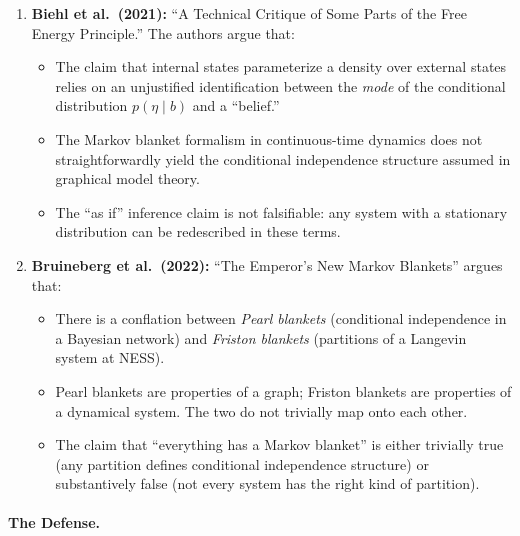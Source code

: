 \documentclass[11pt,a4paper]{article}
\theoremstyle{definition}
\begin{document}
\begin{enumerate}[leftmargin=2em]
  \item \textbf{Biehl et al.\ (2021):} ``A Technical Critique of Some Parts of
    the Free Energy Principle.''  The authors argue that:
    \begin{itemize}
      \item The claim that internal states parameterize a density over external
        states relies on an unjustified identification between the \emph{mode}
        of the conditional distribution $p(\eta \mid b)$ and a ``belief.''
      \item The Markov blanket formalism in continuous-time dynamics does not
        straightforwardly yield the conditional independence structure assumed
        in graphical model theory.
      \item The ``as if'' inference claim is not falsifiable: any system with a
        stationary distribution can be redescribed in these terms.
    \end{itemize}

  \item \textbf{Bruineberg et al.\ (2022):} ``The Emperor's New Markov
    Blankets'' argues that:
    \begin{itemize}
      \item There is a conflation between \emph{Pearl blankets} (conditional
        independence in a Bayesian network) and \emph{Friston blankets}
        (partitions of a Langevin system at NESS).
      \item Pearl blankets are properties of a graph; Friston blankets are
        properties of a dynamical system.  The two do not trivially map onto
        each other.
      \item The claim that ``everything has a Markov blanket'' is either trivially
        true (any partition defines conditional independence structure) or
        substantively false (not every system has the right kind of partition).
    \end{itemize}
\end{enumerate}

\paragraph{The Defense.}
\end{document}
